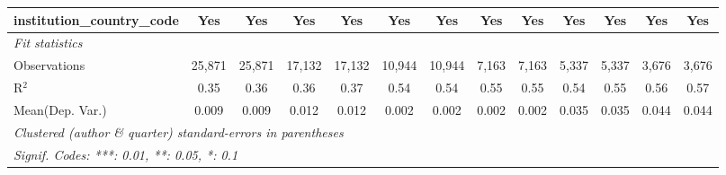 \begin{tabular}{lcccccccccccc}
   institution\_country\_code               & Yes           & Yes            & Yes           & Yes            & Yes           & Yes           & Yes           & Yes           & Yes           & Yes            & Yes           & Yes\\  
   \midrule
   \emph{Fit statistics}\\
   Observations                             & 25,871        & 25,871         & 17,132        & 17,132         & 10,944        & 10,944        & 7,163         & 7,163         & 5,337         & 5,337          & 3,676         & 3,676\\  
   R$^2$                                    & 0.35          & 0.36           & 0.36          & 0.37           & 0.54          & 0.54          & 0.55          & 0.55          & 0.54          & 0.55           & 0.56          & 0.57\\  
Mean(Dep. Var.) & 0.009 & 0.009 & 0.012 & 0.012 & 0.002 & 0.002 & 0.002 & 0.002 & 0.035 & 0.035 & 0.044 & 0.044 \\
   \midrule \midrule
   \multicolumn{13}{l}{\emph{Clustered (author \& quarter) standard-errors in parentheses}}\\
   \multicolumn{13}{l}{\emph{Signif. Codes: ***: 0.01, **: 0.05, *: 0.1}}\\
\end{tabular}
\par\endgroup
